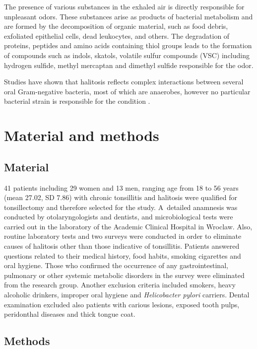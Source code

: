 \documentclass[12pt,a4paper,notitlepage]{report}
\begin{document}
The presence of various substances in the exhaled air is directly responsible for unpleasant odors. These substances arise as products of bacterial   metabolism and are formed by the decomposition of organic material, such as food debris, exfoliated epithelial cells, dead leukocytes, and others. The degradation of proteins, peptides and amino acids containing thiol groups leads to the formation of compounds such as indols, skatols, volatile sulfur compounds (VSC) including hydrogen sulfide, methyl mercaptan and dimethyl sulfide responsible for the odor.

Studies have shown that halitosis reflects complex interactions between several oral Gram-negative bacteria, most of which are anaerobes, however no particular bacterial strain is responsible for the condition \cite{Kotti15}.


\chapter{Material and methods}
\section{Material}

41 patients including 29 women and 13 men, ranging age from 18 to 56 years (mean 27.02, SD 7.86) with chronic tonsillitis and halitosis were qualified for tonsillectomy and therefore selected for the study. \mbox{A detailed} anamnesis was conducted by otolaryngologists and dentists, and microbiological tests were carried out in the laboratory of the Academic Clinical Hospital in Wroclaw. Also, routine laboratory tests and two surveys were conducted in order to eliminate causes of halitosis other than those indicative of tonsillitis. Patients answered questions related to their medical history, food habits, smoking cigarettes and oral hygiene. 
Those who confirmed the occurrence of any gastrointestinal, pulmonary or other systemic metabolic disorders in the survey were eliminated from the research group.
Another exclusion criteria included smokers, heavy alcoholic drinkers, improper oral hygiene and \textit{Helicobacter pylori} carriers. Dental examination excluded also patients with carious lesions, exposed tooth pulps, peridonthal diseases and thick tongue coat.

\section{Methods}
\end{document}
